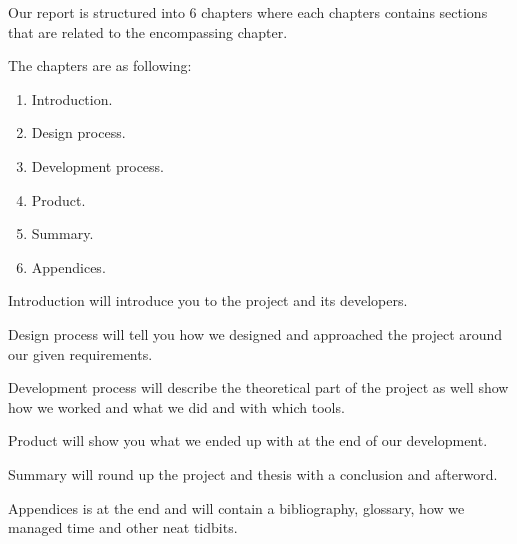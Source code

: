 Our report is structured into 6 chapters where each chapters contains sections that are related to the encompassing chapter.

The chapters are as following:

\begin{enumerate}
	\item Introduction.
	\item Design process.
	\item Development process.
	\item Product.
	\item Summary.
	\item Appendices.
\end{enumerate}

Introduction will introduce you to the project and its developers.


Design process will tell you how we designed and approached the project around our given requirements.


Development process will describe the theoretical part of the project as well show how we worked and what we did and with which tools.


Product will show you what we ended up with at the end of our development.


Summary will round up the project and thesis with a conclusion and afterword.


Appendices is at the end and will contain a bibliography, glossary, how we managed time and other neat tidbits.


